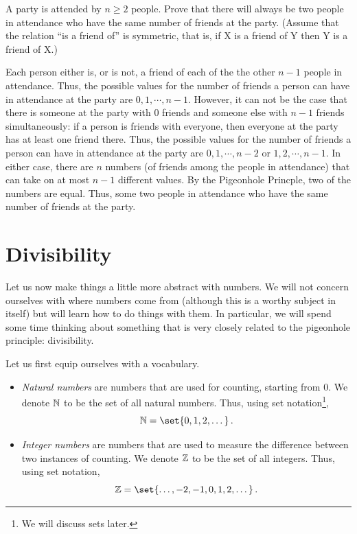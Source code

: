 \begin{exercise}
A party is attended by $n \geq 2$ people. Prove that there will always be
two people in attendance who have the same number of friends at the party. (Assume that
the relation ``is a friend of'' is symmetric, that is, if X is a friend of Y then Y is a friend of
X.)
\end{exercise}

Each person either is, or is not, a friend of each of the the other $n-1$ people in
attendance. Thus, the possible values for the number of friends a person can have in
attendance at the party are $0, 1,\cdots,n-1$. However, it can not be the case that there is
someone at the party with $0$ friends and someone else with $n-1$ friends simultaneously: if a person is
friends with everyone, then everyone at the party has
at least one friend there. Thus, the possible values for the number of friends a person can
have in attendance at the party are $0, 1,\cdots,n-2$ or $1, 2,\cdots,n-1$. In either case, there
are $n$ numbers (of friends among the people in attendance) that can take on at most $n-1$
different values. By the Pigeonhole Princple, two of the numbers are equal. Thus, some
two people in attendance who have the same number of friends at the party.

\section{Divisibility}

Let us now make things a little more abstract with numbers.
We will not concern ourselves with where numbers come from 
(although this is a worthy subject in itself)
but will learn how to do things with them.
In particular, we will spend some time thinking about
something that is very closely related to the pigeonhole principle: divisibility.

Let us first equip ourselves with a vocabulary.

\begin{itemize}
    \item \emph{Natural numbers} are numbers that are used for counting, starting
        from 0.
        We denote $\mathbb{N}$ to be the set of all natural numbers.
        Thus, using set notation\footnote{We will discuss sets later.},
        \begin{equation*}
            \N = \set{0,1,2,\dots}\,.
        \end{equation*}
    \item \emph{Integer numbers} are numbers that are used to measure the difference
        between two instances of counting.
        We denote $\mathbb{Z}$ to be the set of all integers.
        Thus, using set notation,
        \begin{equation*}
            \Z = \set{\dots, -2, -1, 0,1,2,\dots}\,.
        \end{equation*}
\end{itemize}

